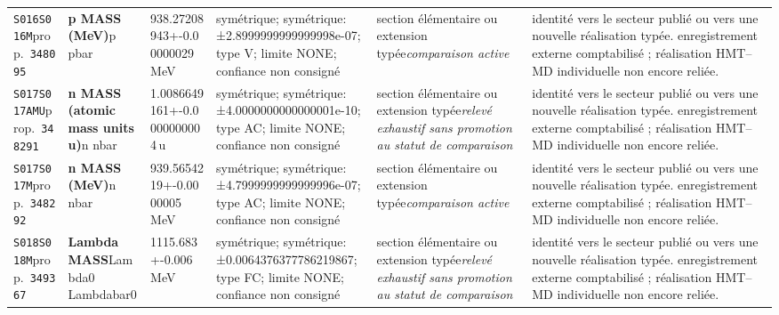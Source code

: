 \begin{landscape}
\begin{longtable}{L{1.85cm}L{4.45cm}L{2.35cm}L{4.05cm}L{3.35cm}L{7.15cm}}
\texttt{S016}\newline \texttt{S016M}\newline prop.\ \texttt{348095} & \textbf{p MASS (MeV)}\newline p \textbar{}\allowbreak{} pbar & 938.27208943+-0.00000029\,MeV & symétrique; symétrique: ±2.8999999999999998e-07; type V; limite NONE; confiance non consigné & section élémentaire ou extension typée\newline \emph{comparaison active} & identité vers le secteur publié ou vers une nouvelle réalisation typée. enregistrement externe comptabilisé ; réalisation HMT--MD individuelle non encore reliée. \\
\texttt{S017}\newline \texttt{S017AMU}\newline prop.\ \texttt{348291} & \textbf{n MASS (atomic mass units u)}\newline n \textbar{}\allowbreak{} nbar & 1.0086649161+-0.0000000004\,u & symétrique; symétrique: ±4.0000000000000001e-10; type AC; limite NONE; confiance non consigné & section élémentaire ou extension typée\newline \emph{relevé exhaustif sans promotion au statut de comparaison} & identité vers le secteur publié ou vers une nouvelle réalisation typée. enregistrement externe comptabilisé ; réalisation HMT--MD individuelle non encore reliée. \\
\texttt{S017}\newline \texttt{S017M}\newline prop.\ \texttt{348292} & \textbf{n MASS (MeV)}\newline n \textbar{}\allowbreak{} nbar & 939.5654219+-0.0000005\,MeV & symétrique; symétrique: ±4.7999999999999996e-07; type AC; limite NONE; confiance non consigné & section élémentaire ou extension typée\newline \emph{comparaison active} & identité vers le secteur publié ou vers une nouvelle réalisation typée. enregistrement externe comptabilisé ; réalisation HMT--MD individuelle non encore reliée. \\
\texttt{S018}\newline \texttt{S018M}\newline prop.\ \texttt{349367} & \textbf{Lambda MASS}\newline Lambda0 \textbar{}\allowbreak{} Lambdabar0 & 1115.683+-0.006\,MeV & symétrique; symétrique: ±0.0064376377786219867; type FC; limite NONE; confiance non consigné & section élémentaire ou extension typée\newline \emph{relevé exhaustif sans promotion au statut de comparaison} & identité vers le secteur publié ou vers une nouvelle réalisation typée. enregistrement externe comptabilisé ; réalisation HMT--MD individuelle non encore reliée. \\

\end{longtable}
\end{landscape}
